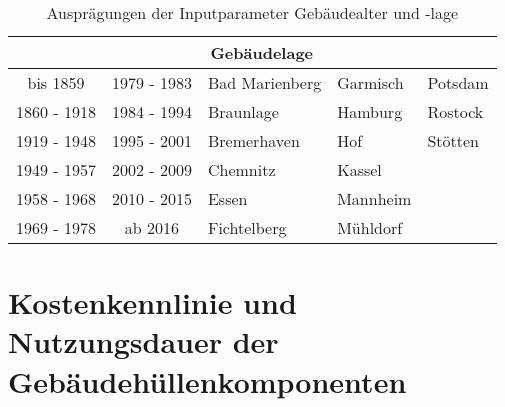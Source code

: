 \begin{table}[H]\centering
\begin{tabular}{|c|c|l|l|l|}
\hline
\rowcolor[HTML]{C0C0C0} 
\multicolumn{2}{|c|}{\cellcolor[HTML]{C0C0C0}Gebäudealter} & \multicolumn{3}{c|}{\cellcolor[HTML]{C0C0C0}Gebäudelage} \\ \hline
bis 1859 & 1979 - 1983 & Bad Marienberg & Garmisch & Potsdam \\ \hline
\rowcolor[HTML]{EFEFEF} 
1860 - 1918 & 1984 - 1994 & Braunlage & Hamburg & Rostock \\ \hline
1919 - 1948 & 1995 - 2001 & Bremerhaven & Hof & Stötten \\ \hline
\rowcolor[HTML]{EFEFEF} 
1949 - 1957 & 2002 - 2009 & Chemnitz & Kassel &  \\ \hline
1958 - 1968 & 2010 - 2015 & Essen & Mannheim &  \\ \hline
\rowcolor[HTML]{EFEFEF} 
1969 - 1978 & ab 2016 & Fichtelberg & Mühldorf &  \\ \hline
\end{tabular}
\caption{Ausprägungen der Inputparameter Gebäudealter und -lage}
\label{tab: TabelleA3}
\end{table}

\section{Kostenkennlinie und Nutzungsdauer der Gebäudehüllenkomponenten}

